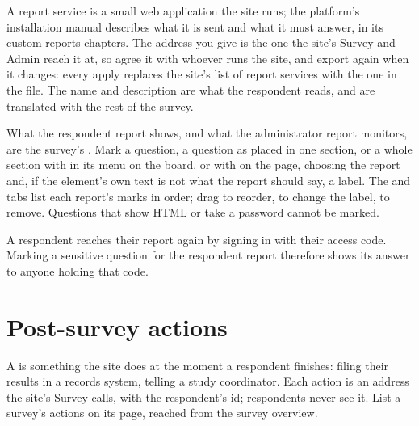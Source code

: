\documentclass[11pt, a4paper]{article}
\begin{document}

\begin{elicitnote}
A report service is a small web application the site runs; the platform's installation manual
describes what it is sent and what it must answer, in its custom reports chapters. The address
you give is the one the site's Survey and Admin reach it at, so agree it with whoever runs the
site, and export again when it changes: every apply replaces the site's list of report services
with the one in the file. The name and description are what the respondent reads, and are
translated with the rest of the survey.
\end{elicitnote}

What the respondent report shows, and what the administrator report monitors, are the survey's
. Mark a question, a question as placed in one section, or a whole section
with  in its menu on the board, or with  on the
 page, choosing the report and, if the element's own text is not what the report
should say, a label. The  and  tabs list each report's marks
in order; drag to reorder,  to change the label,  to remove.
Questions that show HTML or take a password cannot be marked.

\begin{elicitcaution}
A respondent reaches their report again by signing in with their access code. Marking a
sensitive question for the respondent report therefore shows its answer to anyone holding
that code.
\end{elicitcaution}

\section{Post-survey actions}
\label{sec:actions}

A  is something the site does at the moment a respondent finishes:
filing their results in a records system, telling a study coordinator. Each action is an
address the site's Survey calls, with the respondent's id; respondents never see it. List a
survey's actions on its  page, reached from the survey overview.

\end{document}
